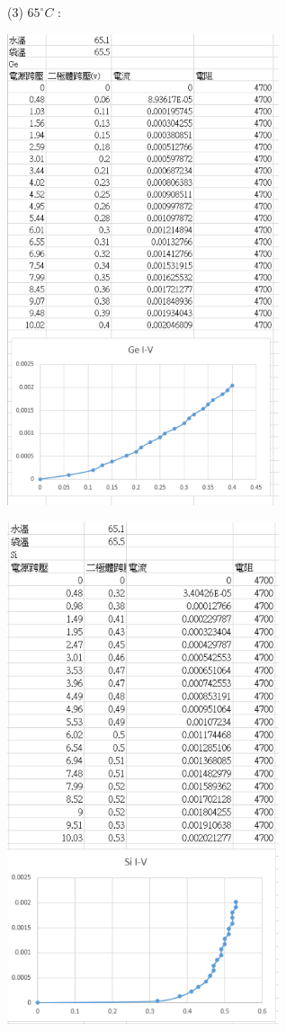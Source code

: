 \documentclass[UTF8]{ctexart}
\begin{document}
\begin{CJK*}{UTF8}{song}
(3) $65^{\circ}C$ : \\

\begin{minipage}[t]{0.48\textwidth}
\centering %
\includegraphics[width = 0.6\textwidth]{65ge.png}
\end{minipage} %
\begin{minipage}[t]{0.48\textwidth}
\centering
\includegraphics[width = 0.6\textwidth]{65si.png}
\end{minipage}
 \\


\end{CJK*}
\end{document}
